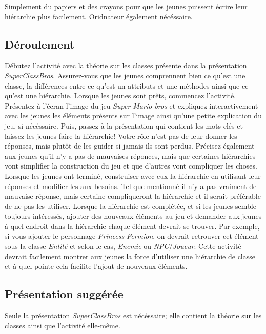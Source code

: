 \documentclass[]{report}
\begin{document}
\begin{adjustwidth}{1.5cm}{0cm}
Simplement du papiers et des crayons pour que les jeunes puissent écrire leur hiérarchie plus facilement. Oridnateur également nécéssaire.

\subsection*{\Large{Déroulement}}
\vspace{-5mm}\makebox[0.917\textwidth]{\hrulefill}\vspace{3mm}

Débutez l'activité avec la théorie sur les classes présente dans la présentation \textit{SuperClassBros}. Assurez-vous que les jeunes comprennent bien ce qu'est une classe, la différences entre ce qu'est un attributs et une méthodes ainsi que ce qu'est une hiérarchie. Lorsque les jeunes sont prêts, commencez l'activité.
\\

Présentez à l'écran l'image du jeu \textit{Super Mario bros} et expliquez interactivement avec les jeunes les éléments présents sur l'image ainsi qu'une petite explication du jeu, si nécéssaire. Puis, passez à la présentation qui contient les mots clés et laissez les jeunes faire la hiérarchie! Votre rôle n'est pas de leur donner les réponses, mais plutôt de les guider si jamais ils sont perdus. Précisez également aux jeunes qu'il n'y a pas de mauvaises réponces, mais que certaines hiérarchies vont simplifier la construction du jeu et que d'autres vont compliquer les choses.
\\

Lorsque les jeunes ont terminé, construiser avec eux la hiérarchie en utilisant leur réponses et modifier-les aux besoins. Tel que mentionné il n'y a pas vraiment de mauvaise réponse, mais certaine compliqueront la hiérarchie et il serait préférable de ne pas les utiliser. Lorsque la hiérarchie est complétée, et si les jeunes semble toujours intéressés, ajouter des nouveaux éléments au jeu et demander aux jeunes à quel endroit dans la hiérarchie chaque élément devrait se trouver. Par exemple, si vous ajouter le personnage \textit{Princess Fermion}, on devrait retrouver cet élément sous la classe \textit{Entité} et selon le cas, \textit{Enemie} ou \textit{NPC}/\textit{Joueur}. Cette activité devrait facilement montrer aux jeunes la force d'utiliser une hiérarchie de classe et à quel pointe cela facilite l'ajout de nouveaux éléments.

\subsection*{\Large{Présentation suggérée}}
\vspace{-5mm}\makebox[0.917\textwidth]{\hrulefill}\vspace{3mm}

Seule la présentation \textit{SuperClassBros} est nécéssaire; elle contient la théorie sur les classes ainsi que l'activité elle-même.



\end{adjustwidth}
\end{document}

